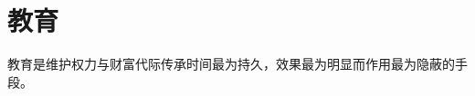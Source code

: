 \documentclass[main.tex]{subfiles}
\begin{document}
\section{教育}
教育是维护权力与财富代际传承时间最为持久，效果最为明显而作用最为隐蔽的手段。
\end{document}
